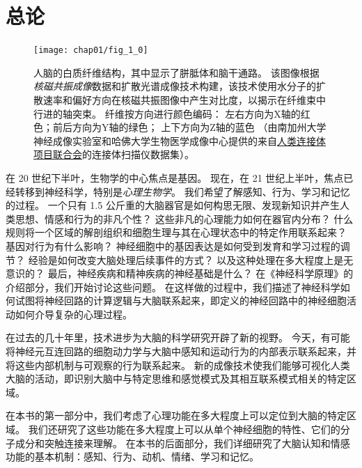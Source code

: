 \hypersetup{bookmarksopen=false}

\part{总论}

\begin{figure}[htbp]
	\centering
	\texttt{[image: chap01/fig\_1\_0]}
	\caption{人脑的白质纤维结构，其中显示了胼胝体和脑干通路。
		该图像根据\textit{核磁共振成像}数据和扩散光谱成像技术构建，该技术使用水分子的扩散速率和偏好方向在核磁共振图像中产生对比度，以揭示在纤维束中行进的轴突束。
		纤维按方向进行颜色编码：
		左右方向为X轴的红色；前后方向为Y轴的绿色；
		上下方向为Z轴的蓝色
		（由南加州大学神经成像实验室和哈佛大学生物医学成像中心提供的来自\href{www.humanconnetomproject.org}{人类连接体项目联合会}的连接体扫描仪数据集）。}
	\label{fig:1_0}
\end{figure}

在 20 世纪下半叶，生物学的中心焦点是基因。
现在，在 21 世纪上半叶，焦点已经转移到神经科学，特别是\textit{心理生物学}。
我们希望了解感知、行为、学习和记忆的过程。
一个只有 1.5 公斤重的大脑器官是如何构思无限、发现新知识并产生人类思想、情感和行为的非凡个性？
这些非凡的心理能力如何在器官内分布？
什么规则将一个区域的解剖组织和细胞生理与其在心理状态中的特定作用联系起来？
基因对行为有什么影响？
神经细胞中的基因表达是如何受到发育和学习过程的调节？
经验是如何改变大脑处理后续事件的方式？
以及这种处理在多大程度上是无意识的？
最后，神经疾病和精神疾病的神经基础是什么？
在《神经科学原理》的介绍部分，我们开始讨论这些问题。
在这样做的过程中，我们描述了神经科学如何试图将神经回路的计算逻辑与大脑联系起来，即定义的神经回路中的神经细胞活动如何介导复杂的心理过程。


在过去的几十年里，技术进步为大脑的科学研究开辟了新的视野。
今天，有可能将神经元互连回路的细胞动力学与大脑中感知和运动行为的内部表示联系起来，并将这些内部机制与可观察的行为联系起来。
新的成像技术使我们能够可视化人类大脑的活动，即识别大脑中与特定思维和感觉模式及其相互联系模式相关的特定区域。


在本书的第一部分中，我们考虑了心理功能在多大程度上可以定位到大脑的特定区域。
我们还研究了这些功能在多大程度上可以从单个神经细胞的特性、它们的分子成分和突触连接来理解。
在本书的后面部分，我们详细研究了大脑认知和情感功能的基本机制：感知、行为、动机、情绪、学习和记忆。


